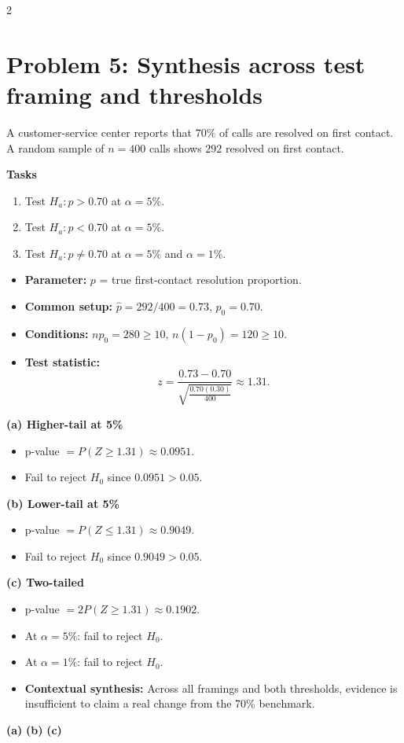 \begin{multicols}{2}
\section{Problem 5: Synthesis across test framing and thresholds}
A customer-service center reports that \(70\%\) of calls are resolved on first contact. A random sample of \(n=400\) calls shows \(292\) resolved on first contact.

\textbf{Tasks}
\begin{enumerate}
    \item[(a)] Test \(H_a:p>0.70\) at \(\alpha=5\%\).
    \item[(b)] Test \(H_a:p<0.70\) at \(\alpha=5\%\).
    \item[(c)] Test \(H_a:p\ne0.70\) at \(\alpha=5\%\) and \(\alpha=1\%\).
\end{enumerate}

\begin{itemize}
    \item \textbf{Parameter:} \(p\) = true first-contact resolution proportion.
    \item \textbf{Common setup:} \(\hat p=292/400=0.73\), \(p_0=0.70\).
    \item \textbf{Conditions:} \(np_0=280\ge10\), \(n(1-p_0)=120\ge10\).
    \item \textbf{Test statistic:}
    \[
    z=\frac{0.73-0.70}{\sqrt{\frac{0.70(0.30)}{400}}}\approx1.31.
    \]
\end{itemize}

\textbf{(a) Higher-tail at 5\%}
\begin{itemize}
    \item p-value \(=P(Z\ge1.31)\approx0.0951\).
    \item Fail to reject \(H_0\) since \(0.0951>0.05\).
\end{itemize}

\textbf{(b) Lower-tail at 5\%}
\begin{itemize}
    \item p-value \(=P(Z\le1.31)\approx0.9049\).
    \item Fail to reject \(H_0\) since \(0.9049>0.05\).
\end{itemize}

\textbf{(c) Two-tailed}
\begin{itemize}
    \item p-value \(=2P(Z\ge1.31)\approx0.1902\).
    \item At \(\alpha=5\%\): fail to reject \(H_0\).
    \item At \(\alpha=1\%\): fail to reject \(H_0\).
    \item \textbf{Contextual synthesis:} Across all framings and both thresholds, evidence is insufficient to claim a real change from the 70\% benchmark.
\end{itemize}

\begin{center}
\textbf{(a)}\;
\hspace{0.5cm}
\textbf{(b)}\;
\hspace{0.5cm}
\textbf{(c)}\;
\end{center}

\end{multicols}



